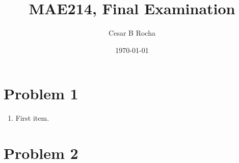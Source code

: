 \documentclass[11pt]{article}
\title{MAE214, Final Examination}
\author{Cesar B Rocha}
\date{\today}
\begin{document}


\maketitle

\section*{Problem 1}


\begin{enumerate}[label=(\alph*)]

    \item First item.


\end{enumerate}


\section*{Problem 2}
\end{document}
